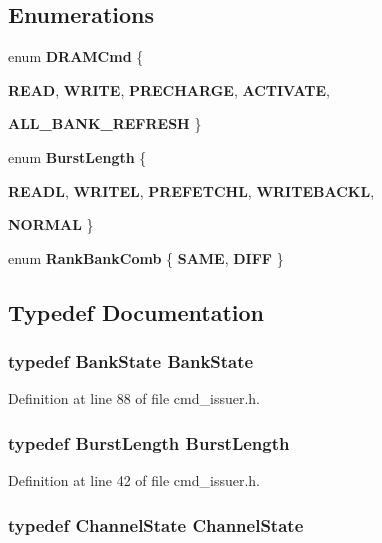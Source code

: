 \subsection*{Enumerations}
\begin{CompactItemize}
\item 
enum {\bf DRAMCmd} \{ \par
{\bf READ}, 
{\bf WRITE}, 
{\bf PRECHARGE}, 
{\bf ACTIVATE}, 
\par
{\bf ALL\_\-BANK\_\-REFRESH}
 \}
\item 
enum {\bf BurstLength} \{ \par
{\bf READL}, 
{\bf WRITEL}, 
{\bf PREFETCHL}, 
{\bf WRITEBACKL}, 
\par
{\bf NORMAL}
 \}
\item 
enum {\bf RankBankComb} \{ {\bf SAME}, 
{\bf DIFF}
 \}
\end{CompactItemize}


\subsection{Typedef Documentation}
\subsubsection[{BankState}]{\setlength{\rightskip}{0pt plus 5cm}typedef {\bf BankState} {\bf BankState}}\label{cmd__issuer_8h_263a9c2fb283d8d83d60fc539a506c0d}




Definition at line 88 of file cmd\_\-issuer.h.
\subsubsection[{BurstLength}]{\setlength{\rightskip}{0pt plus 5cm}typedef {\bf BurstLength} {\bf BurstLength}}\label{cmd__issuer_8h_c59e023a78acd75eadc82e4fc366eaea}




Definition at line 42 of file cmd\_\-issuer.h.
\subsubsection[{ChannelState}]{\setlength{\rightskip}{0pt plus 5cm}typedef {\bf ChannelState} {\bf ChannelState}}\label{cmd__issuer_8h_d068299213ab072a5b333e9fde6f6299}




